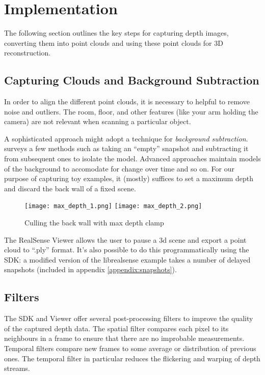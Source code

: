 \section{Implementation}

The following section outlines the key steps for capturing
depth images, converting them into point clouds and using these point clouds
for 3D reconstruction.

\subsection{Capturing Clouds and Background Subtraction}

In order to align the different point clouds, it is necessary to helpful to remove
noise and outliers. The room, floor, and other features
(like your arm holding the camera) are not relevant when scanning a particular object.

A sophisticated approach might adopt a technique for \textit{background subtraction}. \cite{piccardi2004background} surveys a few methods such as  taking an ``empty'' snapshot and subtracting it from subsequent ones to isolate the model.
Advanced approaches maintain models of the background to accomodate for change over time and so on.
For our purpose of capturing toy examples, it (mostly) suffices to set a maximum depth
and discard the back wall of a fixed scene.

\begin{figure}[h]
\centering
\texttt{[image: max\_depth\_1.png]}
\texttt{[image: max\_depth\_2.png]}
\caption{Culling the back wall with max depth clamp}
\end{figure}

The RealSense Viewer allows the user
to pause a 3d scene and export a point cloud to ``.ply'' format. It's also possible to do this programmatically using the SDK: a modified version of the librealsense  example
takes a number of delayed snapshots (included in appendix \ref{appendix:snapshots}).

\subsection{Filters}

The SDK and Viewer offer several post-processing filters to improve the quality of
the captured depth data. The spatial filter compares each pixel to its neighbours in a
frame to ensure that there are no improbable measurements. Temporal filters
compare new frames to some average or distribution of previous ones. The temporal
filter in particular reduces the flickering and warping of depth streams.

